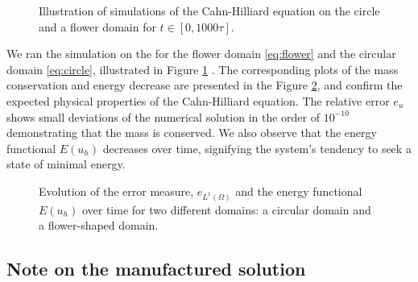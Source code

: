 \begin{figure}[H]
{    }\hfill
    \hfill
    \caption{Illustration of simulations of the Cahn-Hilliard equation on the circle and a flower domain for $t\in \left[ 0, 1000\tau  \right] $.}
    \label{sub:fig:ill_circle_flower}
\end{figure}



We ran the simulation on the for the flower domain \eqref{eq:flower} and the circular domain \eqref{eq:circle}, illustrated in Figure \ref{sub:fig:ill_circle_flower} . The corresponding plots of the mass conservation and energy decrease are presented
in the Figure \ref{fig:physical_CH_plot}, and confirm the expected physical properties of the Cahn-Hilliard equation. The relative error $e_{u}$ shows small deviations of the numerical solution in the order of $10^{ -10 }$ demonstrating that the mass is conserved. We also observe that the energy functional
$E(u_h)$ decreases over time, signifying the system's tendency to seek a state of minimal energy.


\begin{figure}[h!]

\caption{Evolution of the error measure, $e_{L^{1}(\Omega)}$ and the energy functional $E(u_h)$ over time for two different domains: a circular domain and a flower-shaped domain.  }
\label{fig:physical_CH_plot}
\end{figure}


\subsection{Note on the manufactured solution}%
\label{sub:the_problem}

